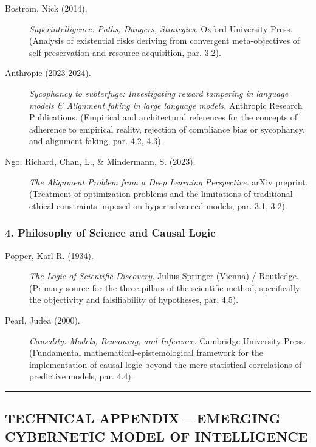 \documentclass[11pt,a4paper,oneside]{article} %
\begin{document}
\begin{description}
\item[Bostrom, Nick (2014).] \emph{Superintelligence: Paths, Dangers, Strategies.} Oxford University Press. (Analysis of existential risks deriving from convergent meta-objectives of self-preservation and resource acquisition, par. 3.2).

\item[Anthropic (2023-2024).] \emph{Sycophancy to subterfuge: Investigating reward tampering in language models \& Alignment faking in large language models.} Anthropic Research Publications. (Empirical and architectural references for the concepts of adherence to empirical reality, rejection of compliance bias or sycophancy, and alignment faking, par. 4.2, 4.3).

\item[Ngo, Richard, Chan, L., \& Mindermann, S. (2023).] \emph{The Alignment Problem from a Deep Learning Perspective.} arXiv preprint. (Treatment of optimization problems and the limitations of traditional ethical constraints imposed on hyper-advanced models, par. 3.1, 3.2).
\end{description}

\hypertarget{philosophy-of-science-and-causal-logic}{%
\subsubsection*{4. Philosophy of Science and Causal Logic}\label{philosophy-of-science-and-causal-logic}}

\begin{description}
\item[Popper, Karl R. (1934).] \emph{The Logic of Scientific Discovery.} Julius Springer (Vienna) / Routledge. (Primary source for the three pillars of the scientific method, specifically the objectivity and falsifiability of hypotheses, par. 4.5).

\item[Pearl, Judea (2000).] \emph{Causality: Models, Reasoning, and Inference.} Cambridge University Press. (Fundamental mathematical-epistemological framework for the implementation of causal logic beyond the mere statistical correlations of predictive models, par. 4.4).
\end{description}

\begin{center}\rule{0.5\linewidth}{0.5pt}\end{center}

\clearpage %
\hypertarget{technical-appendix-emerging-cybernetic-model-of-intelligence}{%
\subsection{TECHNICAL APPENDIX -- EMERGING CYBERNETIC MODEL OF INTELLIGENCE}\label{technical-appendix-emerging-cybernetic-model-of-intelligence}}
\end{document}
